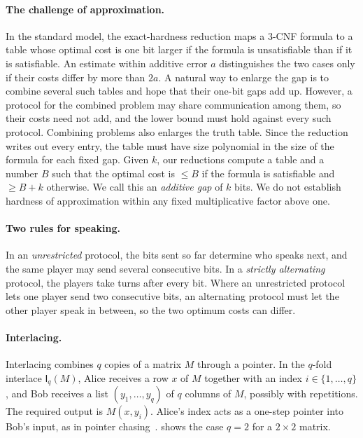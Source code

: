 \documentclass[11pt,letterpaper]{article} \usepackage[utf8]{inputenc}
\theoremstyle{plain} \newtheorem{theorem}{Theorem}[section]
\theoremstyle{definition} \newaliascnt{definition}{theorem}
\newcommand{\Int}[2]{\mathsf{I}_{#1}(#2)}
\begin{document}
\paragraph{The challenge of approximation.}
In the standard model, the exact-hardness reduction maps a $3$-CNF formula
to a table whose optimal cost is one bit larger if the formula is
unsatisfiable than if it is satisfiable. An estimate within additive error
$a$ distinguishes the two cases only if their costs differ by more than
$2a$. A natural way to enlarge the gap is to combine several such tables
and hope that their one-bit gaps add up. However, a protocol for the combined problem may share
communication among them, so their costs need not add, and the lower bound
must hold against every such protocol.
Combining problems also enlarges the truth table. Since the reduction
writes out every entry, the table must have size polynomial in the size of
the formula for each fixed gap. Given $k$, our reductions compute a table
and a number $B$ such that the optimal cost is $\le B$ if the formula is
satisfiable and $\ge B+k$ otherwise. We call this an \emph{additive gap}
of $k$ bits. We do not establish hardness of approximation within any
fixed multiplicative factor above one.

\paragraph{Two rules for speaking.}
In an \emph{unrestricted} protocol, the bits sent so far determine who
speaks next, and the same player may send several consecutive bits. In a
\emph{strictly alternating} protocol, the players take turns after every
bit. Where an unrestricted protocol lets one player send two consecutive
bits, an alternating protocol must let the other player speak in between,
so the two optimum costs can differ.

\paragraph{Interlacing.}
Interlacing combines $q$ copies of a matrix $M$ through a pointer. In the $q$-fold interlace $\Int{q}{M}$, Alice
receives a row $x$ of $M$ together with an index $i\in\{1,\ldots,q\}$, and
Bob receives a list $(y_1,\ldots,y_q)$ of $q$ columns of $M$, possibly
with repetitions. The required output is $M(x,y_i)$.
Alice's index acts as a one-step pointer into Bob's input, as in pointer
chasing~\cite{nisan1993rounds}.  shows the case $q=2$
for a $2\times2$ matrix.
\end{document}
